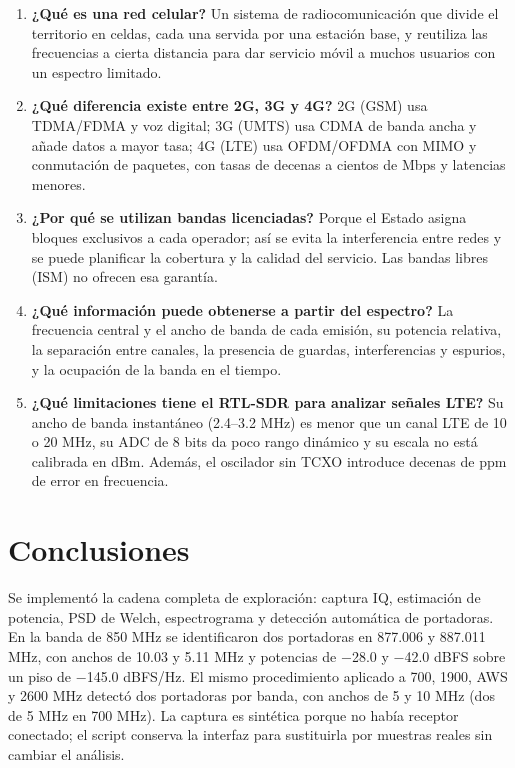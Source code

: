 \documentclass[11pt,a4paper]{article}
\begin{document}
\begin{enumerate}
  \item \textbf{¿Qué es una red celular?} Un sistema de radiocomunicación que divide el
        territorio en celdas, cada una servida por una estación base, y reutiliza las
        frecuencias a cierta distancia para dar servicio móvil a muchos usuarios con un
        espectro limitado.
  \item \textbf{¿Qué diferencia existe entre 2G, 3G y 4G?} 2G (GSM) usa TDMA/FDMA y voz
        digital; 3G (UMTS) usa CDMA de banda ancha y añade datos a mayor tasa; 4G (LTE)
        usa OFDM/OFDMA con MIMO y conmutación de paquetes, con tasas de decenas a cientos
        de Mbps y latencias menores.
  \item \textbf{¿Por qué se utilizan bandas licenciadas?} Porque el Estado asigna bloques
        exclusivos a cada operador; así se evita la interferencia entre redes y se puede
        planificar la cobertura y la calidad del servicio. Las bandas libres (ISM) no
        ofrecen esa garantía.
  \item \textbf{¿Qué información puede obtenerse a partir del espectro?} La frecuencia
        central y el ancho de banda de cada emisión, su potencia relativa, la separación
        entre canales, la presencia de guardas, interferencias y espurios, y la ocupación
        de la banda en el tiempo.
  \item \textbf{¿Qué limitaciones tiene el RTL-SDR para analizar señales LTE?} Su ancho de
        banda instantáneo (2.4--3.2 MHz) es menor que un canal LTE de 10 o 20 MHz, su ADC
        de 8 bits da poco rango dinámico y su escala no está calibrada en dBm. Además, el
        oscilador sin TCXO introduce decenas de ppm de error en frecuencia.
\end{enumerate}

\section{Conclusiones}

Se implementó la cadena completa de exploración: captura IQ, estimación de potencia, PSD
de Welch, espectrograma y detección automática de portadoras. En la banda de 850 MHz se
identificaron dos portadoras en 877.006 y 887.011 MHz, con anchos de 10.03 y 5.11 MHz y
potencias de $-$28.0 y $-$42.0 dBFS sobre un piso de $-$145.0 dBFS/Hz. El mismo
procedimiento aplicado a 700, 1900, AWS y 2600 MHz detectó dos portadoras por banda, con anchos de 5 y 10 MHz (dos de 5 MHz en 700 MHz). La captura es sintética porque no había receptor conectado;
el script conserva la interfaz para sustituirla por muestras reales sin cambiar el análisis.
\end{document}
